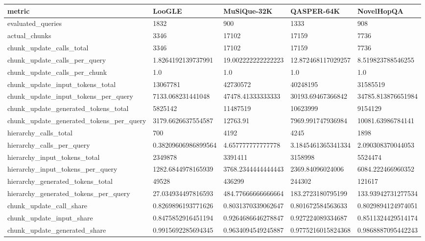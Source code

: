 \begin{tabular}{lllll}
\hline
metric & LooGLE & MuSiQue-32K & QASPER-64K & NovelHopQA \\
\hline
evaluated\_queries & 1832 & 900 & 1333 & 908 \\
actual\_chunks & 3346 & 17102 & 17159 & 7736 \\
chunk\_update\_calls\_total & 3346 & 17102 & 17159 & 7736 \\
chunk\_update\_calls\_per\_query & 1.8264192139737991 & 19.002222222222223 & 12.872468117029257 & 8.519823788546255 \\
chunk\_update\_calls\_per\_chunk & 1.0 & 1.0 & 1.0 & 1.0 \\
chunk\_update\_input\_tokens\_total & 13067781 & 42730572 & 40248195 & 31585519 \\
chunk\_update\_input\_tokens\_per\_query & 7133.068231441048 & 47478.41333333333 & 30193.69467366842 & 34785.813876651984 \\
chunk\_update\_generated\_tokens\_total & 5825142 & 11487519 & 10623999 & 9154129 \\
chunk\_update\_generated\_tokens\_per\_query & 3179.6626637554587 & 12763.91 & 7969.991747936984 & 10081.63986784141 \\
hierarchy\_calls\_total & 700 & 4192 & 4245 & 1898 \\
hierarchy\_calls\_per\_query & 0.38209606986899564 & 4.657777777777778 & 3.1845461365341334 & 2.090308370044053 \\
hierarchy\_input\_tokens\_total & 2349878 & 3391411 & 3158998 & 5524474 \\
hierarchy\_input\_tokens\_per\_query & 1282.6844978165939 & 3768.2344444444443 & 2369.84096024006 & 6084.222466960352 \\
hierarchy\_generated\_tokens\_total & 49528 & 436299 & 244302 & 121617 \\
hierarchy\_generated\_tokens\_per\_query & 27.034934497816593 & 484.77666666666664 & 183.2723180795199 & 133.93942731277534 \\
chunk\_update\_call\_share & 0.8269896193771626 & 0.8031370339062647 & 0.801672584563633 & 0.8029894124974051 \\
chunk\_update\_input\_share & 0.8475852916451194 & 0.9264686646278847 & 0.927224089334687 & 0.8511324429514174 \\
chunk\_update\_generated\_share & 0.9915692285694345 & 0.9634094549245887 & 0.9775216015824368 & 0.9868887095442243 \\
\hline
\end{tabular}
